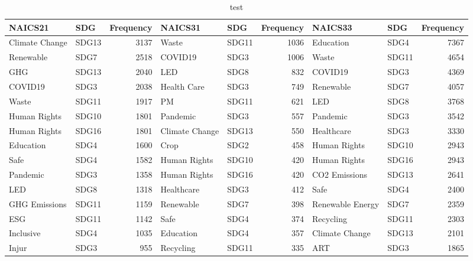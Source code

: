 \begin{table}

\caption{test}
\centering
\begin{tabular}[t]{llrllrllr}
\toprule
NAICS21 & SDG & Frequency & NAICS31 & SDG  & Frequency  & NAICS33 & SDG   & Frequency  \\
\midrule
Climate Change & SDG13 & 3137 & Waste & SDG11 & 1036 & Education & SDG4 & 7367\\
Renewable & SDG7 & 2518 & COVID19 & SDG3 & 1006 & Waste & SDG11 & 4654\\
GHG & SDG13 & 2040 & LED & SDG8 & 832 & COVID19 & SDG3 & 4369\\
COVID19 & SDG3 & 2038 & Health Care & SDG3 & 749 & Renewable & SDG7 & 4057\\
Waste & SDG11 & 1917 & PM & SDG11 & 621 & LED & SDG8 & 3768\\
\addlinespace
Human Rights & SDG10 & 1801 & Pandemic & SDG3 & 557 & Pandemic & SDG3 & 3542\\
Human Rights & SDG16 & 1801 & Climate Change & SDG13 & 550 & Healthcare & SDG3 & 3330\\
Education & SDG4 & 1600 & Crop & SDG2 & 458 & Human Rights & SDG10 & 2943\\
Safe & SDG4 & 1582 & Human Rights & SDG10 & 420 & Human Rights & SDG16 & 2943\\
Pandemic & SDG3 & 1358 & Human Rights & SDG16 & 420 & CO2 Emissions & SDG13 & 2641\\
\addlinespace
LED & SDG8 & 1318 & Healthcare & SDG3 & 412 & Safe & SDG4 & 2400\\
GHG Emissions & SDG11 & 1159 & Renewable & SDG7 & 398 & Renewable Energy & SDG7 & 2359\\
ESG & SDG11 & 1142 & Safe & SDG4 & 374 & Recycling & SDG11 & 2303\\
Inclusive & SDG4 & 1035 & Education & SDG4 & 357 & Climate Change & SDG13 & 2101\\
Injur & SDG3 & 955 & Recycling & SDG11 & 335 & ART & SDG3 & 1865\\
\bottomrule
\end{tabular}
\end{table}
